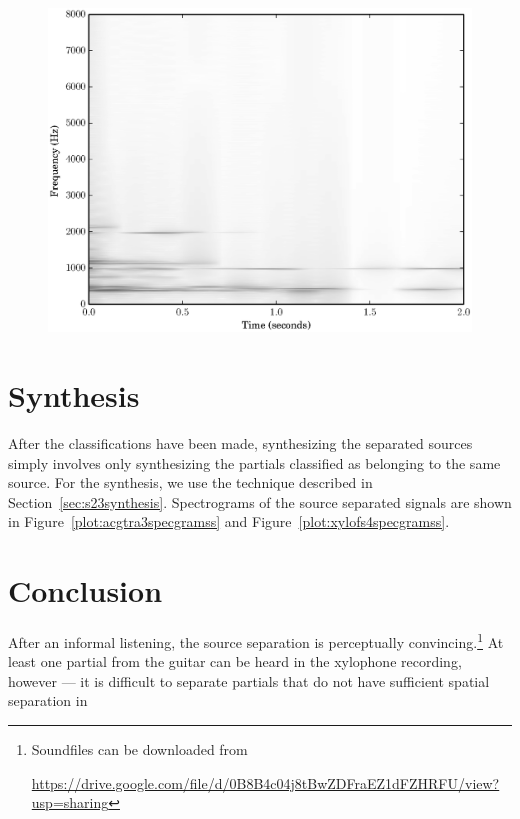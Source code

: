 \begin{samepage} %

\begin{figure}[t]
    \centering
    \includegraphics[width=\figwidthscale\textwidth]{plots/xylo_ss_spec.eps}
\end{figure}

\section{Synthesis}

After the classifications have been made, synthesizing the separated sources
simply involves only synthesizing the partials classified as belonging to the
same source. For the synthesis, we use the technique described in
Section~\ref{sec:s23synthesis}. Spectrograms of the source separated signals
are shown in Figure~\ref{plot:acgtra3specgramss} and
Figure~\ref{plot:xylofs4specgramss}. 

\section{Conclusion}

After an informal listening, the source separation is perceptually
convincing.\footnote{Soundfiles can be downloaded from \par
\url{https://drive.google.com/file/d/0B8B4c04j8tBwZDFraEZ1dFZHRFU/view?usp=sharing}}
At least one partial from the guitar can be heard in the xylophone recording,
however --- it is difficult to separate partials that do not have sufficient
spatial separation in
\end{samepage}%
